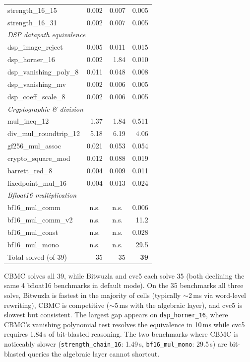 \documentclass[runningheads]{llncs}
\newcommand{\cbmc}{\textsc{CBMC}\xspace}
\begin{document}
\begin{table}[ht]
\begin{tabular}{lrrr}
strength\_16\_15 & 0.002 & 0.007 & 0.005 \\
strength\_16\_31 & 0.002 & 0.007 & 0.005 \\
\midrule
\multicolumn{4}{l}{\emph{DSP datapath equivalence}} \\
dsp\_image\_reject & 0.005 & 0.011 & 0.015 \\
dsp\_horner\_16 & 0.002 & 1.84 & 0.010 \\
dsp\_vanishing\_poly\_8 & 0.011 & 0.048 & 0.008 \\
dsp\_vanishing\_mv & 0.002 & 0.006 & 0.005 \\
dsp\_coeff\_scale\_8 & 0.002 & 0.006 & 0.005 \\
\midrule
\multicolumn{4}{l}{\emph{Cryptographic \& division}} \\
mul\_ineq\_12 & 1.37 & 1.84 & 0.511 \\
div\_mul\_roundtrip\_12 & 5.18 & 6.19 & 4.06 \\
gf256\_mul\_assoc & 0.021 & 0.053 & 0.054 \\
crypto\_square\_mod & 0.012 & 0.088 & 0.019 \\
barrett\_red\_8 & 0.004 & 0.009 & 0.011 \\
fixedpoint\_mul\_16 & 0.004 & 0.013 & 0.024 \\
\midrule
\multicolumn{4}{l}{\emph{Bfloat16 multiplication}} \\
bf16\_mul\_comm & \multicolumn{1}{c}{n.s.} & \multicolumn{1}{c}{n.s.} & 0.006 \\
bf16\_mul\_comm\_v2 & \multicolumn{1}{c}{n.s.} & \multicolumn{1}{c}{n.s.} & 11.2 \\
bf16\_mul\_const & \multicolumn{1}{c}{n.s.} & \multicolumn{1}{c}{n.s.} & 0.028 \\
bf16\_mul\_mono & \multicolumn{1}{c}{n.s.} & \multicolumn{1}{c}{n.s.} & 29.5 \\
\midrule
Total solved (of 39) & 35 & 35 & \textbf{39} \\
\bottomrule
\end{tabular}
\end{table}

\cbmc solves all 39, while Bitwuzla and cvc5 each solve 35 (both
declining the same 4 bfloat16 benchmarks in default mode). On the
35 benchmarks all three solve, Bitwuzla is fastest in
the majority of cells (typically $\sim$2\,ms via word-level
rewriting), \cbmc is competitive ($\sim$5\,ms with the algebraic
layer), and cvc5 is slowest but consistent. The largest gap
appears on \texttt{dsp\_horner\_16}, where \cbmc's vanishing
polynomial test resolves the equivalence in 10\,ms while cvc5
requires 1.84\,s of bit-blasted reasoning. The two
benchmarks where \cbmc is noticeably slower
(\texttt{strength\_chain\_16}: 1.49\,s, \texttt{bf16\_mul\_mono}:
29.5\,s) are bit-blasted queries the algebraic layer cannot
shortcut.
\end{document}

